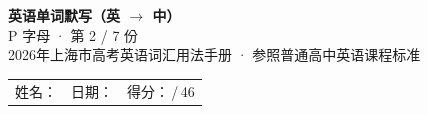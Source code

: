 \documentclass[10pt,a4paper]{article}
\begin{document}
\pagestyle{plain}

\begin{center}
{\LARGE\bfseries 英语单词默写（英 $\to$ 中）}\\[0.22em]
{\large P 字母 · 第 2 / 7 份}\\[0.18em]
{\small 2026年上海市高考英语词汇用法手册 · 参照普通高中英语课程标准}
\end{center}

\vspace{0.25em}
\noindent\begin{tabular}{@{}p{}@{}p{}@{}p{}@{}}
姓名：\underline{\hspace{2.0cm}} & 日期：\underline{\hspace{2.0cm}} & 得分：\underline{\hspace{1.3cm}}\,/\,46 \\
\end{tabular}

\vspace{0.3em}

\vspace{0.08em}
\end{document}
